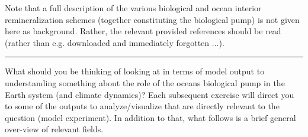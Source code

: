 Note that a full description of the various biological and ocean interior remineralization schemes (together constituting the biological pump) is not given here as background. Rather, the relevant provided references should be read (rather than e.g. downloaded and immediately forgotten ...).

\vspace{1mm}
\noindent\rule{4cm}{0.5pt}
\vspace{2mm}

\newpage

\noindent What should you be thinking of looking at in terms of model output to understanding something about the role of the oceans biological pump in the Earth system (and climate dynamics)? Each subsequent exercise will direct you to some of the outputs to analyze/visualize that are directly relevant to the question (model experiment). In addition to that, what follows is a brief general over-view of relevant fields.

